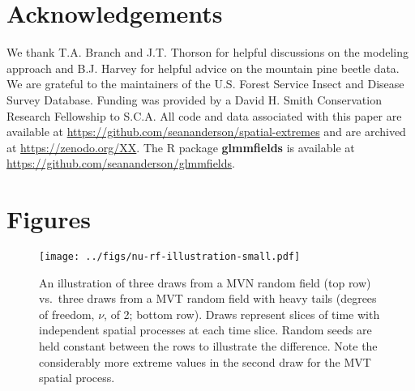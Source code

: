 \documentclass[12pt,english]{article}
\begin{document}
\begin{spacing}{1.9}
\section{Acknowledgements}

We thank T.A. Branch and J.T. Thorson for helpful discussions on the modeling
approach and B.J. Harvey for helpful advice on the mountain pine beetle data. We
are grateful to the maintainers of the U.S. Forest Service Insect and Disease
Survey Database. Funding was provided by a David H. Smith Conservation Research
Fellowship to S.C.A.
All code and data associated with this paper are available at
\url{https://github.com/seananderson/spatial-extremes} and are archived at
\url{https://zenodo.org/XX}.
The R package \textbf{glmmfields} is available at
\url{https://github.com/seananderson/glmmfields}.

\setlength{\bibsep}{0pt plus 0ex}



\clearpage

\section{Figures}

\begin{figure}[htb]
  \begin{center}
    \texttt{[image: ../figs/nu-rf-illustration-small.pdf]}
    \caption{An illustration of three draws from a MVN random field (top row)
      vs.\ three draws from a MVT random field with heavy tails
      (degrees of freedom, $\nu$, of 2; bottom row).
      Draws represent slices of time with independent spatial
      processes at each time slice.
      Random seeds are held constant between the rows
      to illustrate the difference.
      Note the considerably more extreme values in
      the second draw for the MVT spatial process.}
    \label{fig:nu}
  \end{center}
\end{figure}

\clearpage


\end{spacing}
\end{document}
